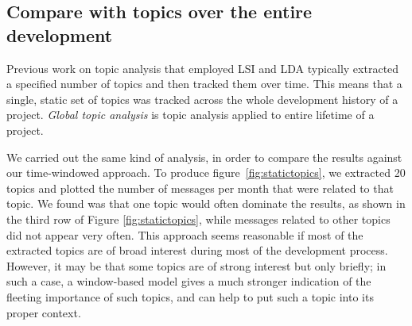 \documentclass[times, 10pt,twocolumn]{article}
\newcommand{\shrinkit}{\vspace*{-.3em}}
\begin{document}













\shrinkit
\subsection{Compare with topics over the entire development}
\shrinkit





Previous work on topic analysis that employed LSI and LDA typically
extracted a specified number of topics and then tracked them over time. This
means that a single, static set of topics was tracked across the whole
development history of a project. \emph{Global topic analysis} is
topic analysis applied to entire lifetime of a project.

We carried out the same kind of analysis, in order to compare the
results against our time-windowed approach.  To produce
figure~\ref{fig:statictopics}, we extracted 20 topics and plotted the
number of messages per month that were related to that topic. We found
was that one topic would often dominate the results, as shown in the
third row of Figure \ref{fig:statictopics}, while messages related to
other topics did not appear very often.
This approach seems reasonable if most of the extracted topics are of
broad interest during most of the development process.  However, it
may be that some topics are of strong interest but only briefly; in
such a case, a window-based model gives a much stronger indication of
the fleeting importance of such topics, and can help to put such a
topic into its proper context.
\end{document}
